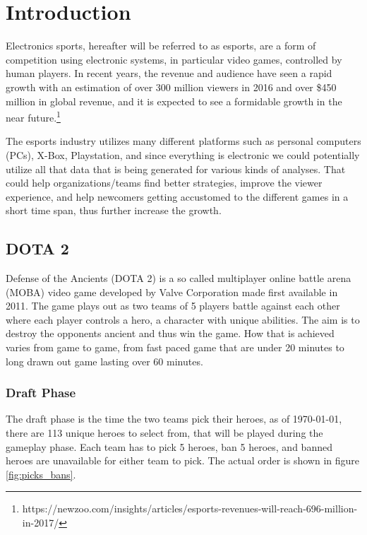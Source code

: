 \documentclass[report.tex]{subfiles}
\begin{document}
\section*{\centering Introduction}

Electronics sports, hereafter will be referred to as esports, are a form of competition using electronic systems, in particular video games, controlled by human players. In recent years, the revenue and audience have seen a rapid growth with an estimation of over 300 million viewers in 2016 and over \$450 million in global revenue, and it is expected to see a formidable growth in the near future.\footnote{https://newzoo.com/insights/articles/esports-revenues-will-reach-696-million-in-2017/}

The esports industry utilizes many different platforms such as personal computers (PCs), X-Box, Playstation, and since everything is electronic we could potentially utilize all that data that is being generated for various kinds of analyses. That could help organizations/teams find better strategies, improve the viewer experience, and help newcomers getting accustomed to the different games in a short time span, thus further increase the growth.

\subsection*{DOTA 2}

Defense of the Ancients (DOTA 2) is a so called multiplayer online battle arena (MOBA) video game developed by Valve Corporation made first available in 2011. The game plays out as two teams of 5 players battle against each other where each player controls a hero, a character with unique abilities. The aim is to destroy the opponents ancient and thus win the game. How that is achieved varies from game to game, from fast paced game that are under 20 minutes to long drawn out game lasting over 60 minutes.

\subsubsection*{Draft Phase}

The draft phase is the time the two teams pick their heroes, as of \today, there are 113 unique heroes to select from, that will be played during the gameplay phase. Each team has to pick 5 heroes, ban 5 heroes, and banned heroes are unavailable for either team to pick. The actual order is shown in figure \ref{fig:picks_bans}.
\end{document}

